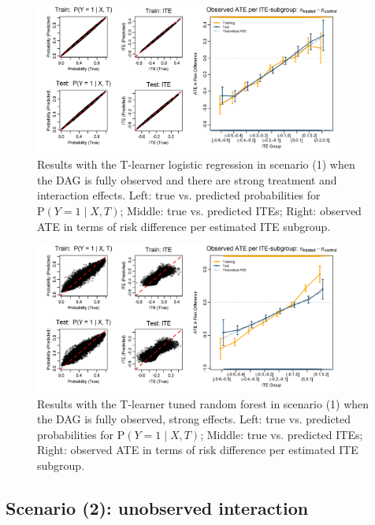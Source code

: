 \begin{figure}[htbp]
\centering
\includegraphics[width=0.9\textwidth]{img/results_ITE_simulation/fully_observed_glm_tlearner.png}
\caption{Results with the T-learner logistic regression in scenario (1) when the DAG is fully observed and there are strong treatment and interaction effects. Left: true vs. predicted probabilities for $\text{P}(Y=1 \mid X, T)$; Middle: true vs. predicted ITEs; Right: observed ATE in terms of risk difference per estimated ITE subgroup.}
\label{fig:fully_observed_glm_tlearner}
\end{figure}


\begin{figure}[htbp]
\centering
\includegraphics[width=0.9\textwidth]{img/results_ITE_simulation/fully_observed_tuned_rf_tlearner.png}
\caption{Results with the T-learner tuned random forest in scenario (1) when the DAG is fully observed, strong effects. Left: true vs. predicted probabilities for $\text{P}(Y=1 \mid X, T)$; Middle: true vs. predicted ITEs; Right: observed ATE in terms of risk difference per estimated ITE subgroup.}
\label{fig:fully_tuned_rf_tlearner}
\end{figure}


\clearpage



\subsection{Scenario (2): unobserved interaction}

